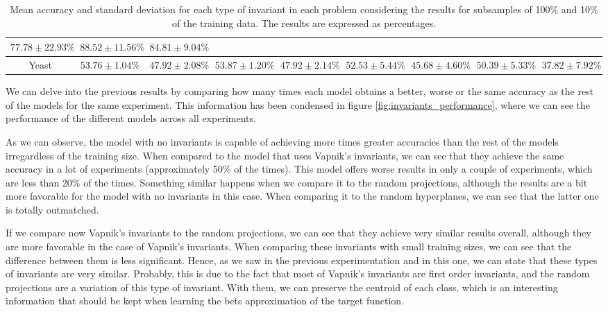 \begin{table}[h]
{\begin{tabular}{c|cc|cc|cc|cc|}
  $77.78 \pm 22.93\%$ &
  \multicolumn{1}{c|}{$88.52 \pm 11.56\%$} &
  $84.81 \pm 9.04\%$ \\ \hline
\multicolumn{1}{|c|}{Yeast} &
  \multicolumn{1}{c|}{$53.76 \pm 1.04\%$} &
  $47.92 \pm 2.08\%$ &
  \multicolumn{1}{c|}{$53.87 \pm 1.20\%$} &
  $47.92 \pm 2.14\%$ &
  \multicolumn{1}{c|}{$52.53 \pm 5.44\%$} &
  $45.68 \pm 4.60\%$ &
  \multicolumn{1}{c|}{$50.39 \pm 5.33\%$} &
  $37.82 \pm 7.92\%$ \\ \hline
\end{tabular}%
}
\caption{Mean accuracy and standard deviation for each type of invariant in each problem considering
the results for subsamples of 100\% and 10\% of the training data. The results are expressed as percentages.}
\label{tab:results_accuracies_errors}
\end{table}

We can delve into the previous results by comparing how many times each model obtains a better, worse
or the same accuracy as the rest of the models for the same experiment. This information has been
condensed in figure \ref{fig:invariants_performance}, where we can see the performance of the
different models across all experiments.

As we can observe, the model with no invariants is capable of achieving more times greater accuracies than
the rest of the models irregardless of the training size. When compared to the model that uses Vapnik's invariants,
we can see that they achieve the same accuracy in a lot of experiments (approximately 50\% of the times). This
model offers worse results in only a couple of experiments, which are less than 20\% of the times. Something similar
happens when we compare it to the random projections, although the results are a bit more favorable for the model
with no invariants in this case. When comparing it to the random hyperplanes, we can see that the latter one
is totally outmatched.

If we compare now Vapnik's invariants to the random projections, we can see that they achieve very similar
results overall, although they are more favorable in the case of Vapnik's invariants. When comparing
these invariants with small training sizes, we can see that the difference between them is less significant.
Hence, as we saw in the previous experimentation and in this one, we can state that these types of invariants are
very similar. Probably, this is due to the fact that most of Vapnik's invariants are first order invariants,
and the random projections are a variation of this type of invariant. With them, we can preserve the centroid of
each class, which is an interesting information that should be kept when learning the bets approximation of the
target function.

